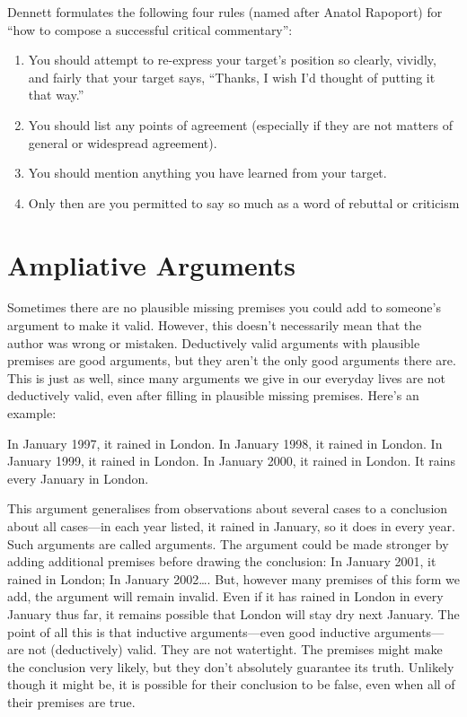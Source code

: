 Dennett formulates the following four rules (named after
Anatol Rapoport) for “how to compose a successful critical
commentary”:
\begin{enumerate}
\item You should attempt to re-express your target’s position so
clearly, vividly, and fairly that your target says, “Thanks, I
wish I’d thought of putting it that way.”
\item You should list any points of agreement (especially if they
are not matters of general or widespread agreement).
\item You should mention anything you have learned from your
target.
\item Only then are you permitted to say so much as a word of
rebuttal or criticism
\end{enumerate}



\section{Ampliative Arguments}
Sometimes there are no plausible missing premises you could add to someone's argument to make it valid.
However, this doesn't necessarily mean that the author was wrong or mistaken.
Deductively valid arguments with plausible premises are good arguments, but they aren't the only good arguments there are. This is just as well, since many arguments we give in our everyday lives are not deductively valid, even after filling in plausible missing premises. Here's an example:
	\begin{earg}
		\prem In January 1997, it rained in London.
		\prem In January 1998, it rained in London.
		\prem In January 1999, it rained in London.
		\prem In January 2000, it rained in London.
	\conc It rains every January in London.
\end{earg}

This argument generalises from observations about several cases to a conclusion about all cases---in each year listed, it rained in January, so it does in every year. Such arguments are called  arguments. The argument could be made stronger by adding additional premises before drawing the conclusion: In January 2001, it rained in London; In January 2002\ldots. But, however many premises of this form we add, the argument will remain invalid. Even if it has rained in London in every January thus far, it remains possible that London will stay dry next January. The point of all this is that inductive arguments—even good inductive arguments—are not (deductively) valid. They are not watertight. The premises might make the conclusion very likely, but they don't absolutely guarantee its truth. Unlikely though it might be, it is possible for their conclusion to be false, even when all of their premises are true.

